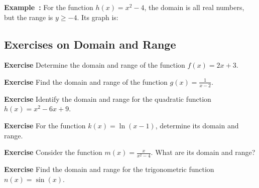 \documentclass[a4paper,12pt]{book}
\newenvironment{exercise}[1][]
  {\par\medskip\noindent\textbf{Exercise #1} \rmfamily}
  {\medskip}
\newcounter{example}
\newenvironment{example}[1][\theexample]
  {\refstepcounter{example}\par\medskip\noindent\textbf{Example~#1:} \rmfamily}
  {\medskip}
\begin{document}
\begin{example}
For the function \( h(x) = x^2 - 4 \), the domain is all real numbers, but the range is \( y \geq -4 \). Its graph is:

\end{example}


\subsection{Exercises on Domain and Range}

\begin{exercise}
Determine the domain and range of the function \( f(x) = 2x + 3 \).
\end{exercise}

\begin{exercise}
Find the domain and range of the function \( g(x) = \frac{1}{x - 2} \).
\end{exercise}

\begin{exercise}
Identify the domain and range for the quadratic function \( h(x) = x^2 - 6x + 9 \).
\end{exercise}

\begin{exercise}
For the function \( k(x) = \ln(x - 1) \), determine its domain and range.
\end{exercise}

\begin{exercise}
Consider the function \( m(x) = \frac{x}{x^2 - 4} \). What are its domain and range?
\end{exercise}

\begin{exercise}
Find the domain and range for the trigonometric function \( n(x) = \sin(x) \).
\end{exercise}
\end{document}
